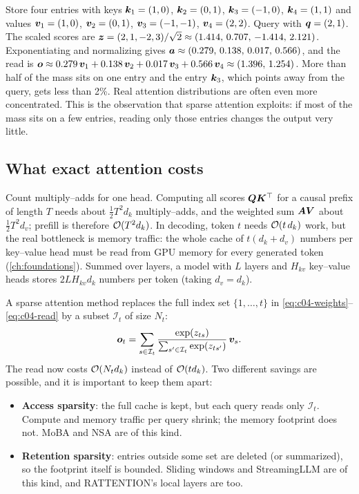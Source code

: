 \begin{example}[A read with $d_k=d_v=2$]\label{ex:c04-read}
Store four entries with keys $\bm{k}_1=(1,0)$, $\bm{k}_2=(0,1)$, $\bm{k}_3=(-1,0)$, $\bm{k}_4=(1,1)$ and
values $\bm{v}_1=(1,0)$, $\bm{v}_2=(0,1)$, $\bm{v}_3=(-1,-1)$, $\bm{v}_4=(2,2)$. Query with
$\bm{q}=(2,1)$. The scaled scores are $\bm{z}=(2,1,-2,3)/\sqrt2\approx(1.414,\,0.707,\,-1.414,\,2.121)$.
Exponentiating and normalizing gives $\bm{a}\approx(0.279,\,0.138,\,0.017,\,0.566)$, and the read is
$\bm{o}\approx 0.279\,\bm{v}_1+0.138\,\bm{v}_2+0.017\,\bm{v}_3+0.566\,\bm{v}_4\approx(1.396,\,1.254)$. More than
half of the mass sits on one entry and the entry $\bm{k}_3$, which points away from the query,
gets less than 2\%. Real attention distributions are often even more concentrated. This is
the observation that sparse attention exploits: if most of the mass sits on a few entries,
reading only those entries changes the output very little.
\end{example}

\subsection{What exact attention costs}\label{sec:c04-costs}

Count multiply--adds for one head. Computing all scores $\bm{Q}\bm{K}^{\top}$ for a causal prefix of
length $T$ needs about $\tfrac12T^2d_k$ multiply--adds, and the weighted sum $\bm{A}\bm{V}$ about
$\tfrac12T^2d_v$; prefill is therefore $\mathcal{O}(T^2 d_k)$. In decoding, token $t$ needs
$\mathcal{O}(t\,d_k)$ work, but the real bottleneck is memory traffic: the whole cache of
$t(d_k+d_v)$ numbers per key--value head must be read from GPU memory for every generated
token (\cref{ch:foundations}). Summed over layers, a model with $L$ layers and $H_{kv}$
key--value heads stores $2LH_{kv}d_k$ numbers per token (taking $d_v=d_k$).

A sparse attention method replaces the full index set $\{1,\dots,t\}$ in
\eqref{eq:c04-weights}--\eqref{eq:c04-read} by a subset $\mathcal{I}_t$ of size $N_t$:
\begin{equation}\label{eq:c04-sparse-read}
  \bm{o}_t = \sum_{s\in\mathcal{I}_t} \frac{\exp(z_{ts})}{\sum_{s'\in\mathcal{I}_t}\exp(z_{ts'})}\,\bm{v}_s .
\end{equation}
The read now costs $\mathcal{O}(N_t d_k)$ instead of $\mathcal{O}(t d_k)$. Two different savings are
possible, and it is important to keep them apart:
\begin{itemize}
  \item \textbf{Access sparsity}: the full cache is kept, but each query reads only
  $\mathcal{I}_t$. Compute and memory traffic per query shrink; the memory footprint does not.
  MoBA and NSA are of this kind.
  \item \textbf{Retention sparsity}: entries outside some set are deleted (or summarized), so the
  footprint itself is bounded. Sliding windows and StreamingLLM are of this kind, and
  RATTENTION's local layers are too.
\end{itemize}

